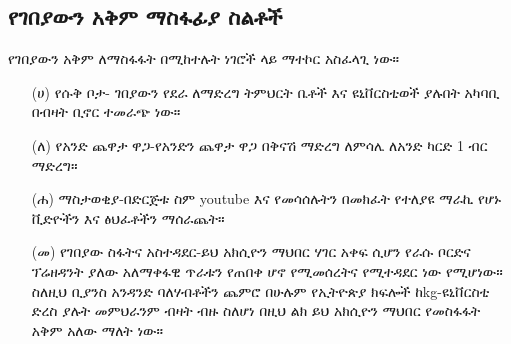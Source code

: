 \documentclass[a4paper,12pt]{article}
\newenvironment{geez}{\geezfont}{}
\begin{document}
\subsection{\begin{geez}የገበያውን አቅም ማስፋፊያ ስልቶች\end{geez}} 
የገበያውን አቅም ለማስፋፋት በሚከተሉት ነገሮች ላይ ማተኮር አስፈላጊ ነው።
\begin{enumerate}
\item[(ሀ)] {\color{red}የሱቅ ቦታ}- ገበያውን የደራ ለማድረግ ትምህርት ቤቶች እና ዩኒቨርስቲወች ያሉበት አካባቢ በብዛት ቢኖር ተመራጭ ነው።
\item[(ለ)] {\color{red} የአንድ ጨዋታ ዋጋ}-የአንድን ጨዋታ ዋጋ በቅናሽ ማድረግ ለምሳሌ ለአንድ ካርድ 1 ብር ማድረግ።
\item[(ሐ)] {\color{red} ማስታወቂያ}-በድርጅቱ ስም youtube እና የመሳሰሉትን በመክፈት የተለያዩ ማራኪ የሆኑ ቪድዮችን እና ፅህፈቶችን ማሰራጨት።
\item[(መ)] {\color{red} የገበያው ስፋትና አስተዳደር}-ይህ አክሲዮን ማህበር ሃገር አቀፍ ሲሆን የራሱ ቦርድና ፕሬዘዳንት ያለው አለማቀፋዊ ጥራቱን የጠበቀ ሆኖ የሚመሰረትና የሚተዳደር ነው የሚሆነው። ስለዚህ ቢያንስ አንዳንድ ባለሃብቶችን ጨምሮ በሁሉም የኢትዮጵያ ክፍሎች ከkg-ዩኒቨርስቲ ድረስ ያሉት መምህራንም ብዛት ብዙ ስለሆነ በዚህ ልክ ይህ አክሲዮን ማህበር የመስፋፋት አቅም አለው ማለት ነው።
\end{enumerate}
\end{document}
